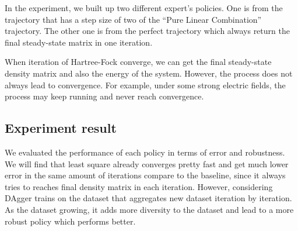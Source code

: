 \documentclass[twoside,11pt]{article}
\begin{document}
In the experiment, we built up two different expert's policies. 
One is from the trajectory that has a step size of two of the ``Pure Linear Combination'' trajectory. The other one is from the perfect trajectory which always return the final steady-state matrix in one iteration.


When iteration of Hartree-Fock converge, we can get the final steady-state density matrix and also the energy of the system. However, the process does not always lead to convergence. For example, under some strong electric fields, the process may keep running and never reach convergence.






 


\subsection{Experiment result}

We evaluated the performance of each policy in terms of error and robustness. We will find that least square already converges pretty fast and get much lower error in the same amount of iterations compare to the baseline, since it always tries to reaches final density matrix in each iteration. However, considering DAgger trains on the dataset that aggregates new dataset iteration by iteration. As the dataset growing, it adds more diversity to the dataset and lead to a more robust policy which performs better.
\end{document}
